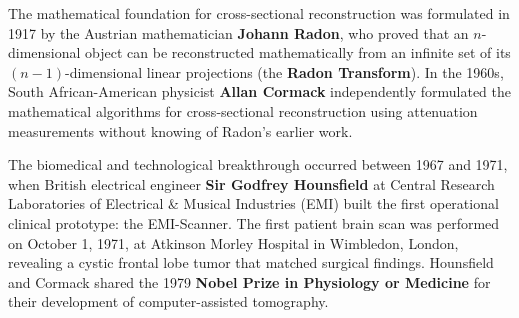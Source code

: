 \documentclass[11pt,a4paper]{article}
\begin{document}
The mathematical foundation for cross-sectional reconstruction was formulated in 1917 by the Austrian mathematician \textbf{Johann Radon}, who proved that an $n$-dimensional object can be reconstructed mathematically from an infinite set of its $(n-1)$-dimensional linear projections (the \textbf{Radon Transform}). In the 1960s, South African-American physicist \textbf{Allan Cormack} independently formulated the mathematical algorithms for cross-sectional reconstruction using attenuation measurements without knowing of Radon's earlier work.

The biomedical and technological breakthrough occurred between 1967 and 1971, when British electrical engineer \textbf{Sir Godfrey Hounsfield} at Central Research Laboratories of Electrical \& Musical Industries (EMI) built the first operational clinical prototype: the EMI-Scanner. The first patient brain scan was performed on October 1, 1971, at Atkinson Morley Hospital in Wimbledon, London, revealing a cystic frontal lobe tumor that matched surgical findings. Hounsfield and Cormack shared the 1979 \textbf{Nobel Prize in Physiology or Medicine} for their development of computer-assisted tomography.
\end{document}
